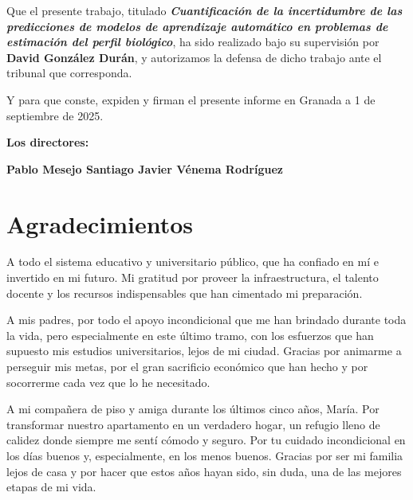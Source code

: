 Que el presente trabajo, titulado \textit{\textbf{Cuantificación de la incertidumbre de las predicciones de modelos de aprendizaje automático en problemas de estimación del perfil biológico}}, ha sido realizado bajo su supervisión por \textbf{David González Durán}, y autorizamos la defensa de dicho trabajo ante el tribunal que corresponda.

\vspace{0.5cm}

Y para que conste, expiden y firman el presente informe en Granada a 1 de septiembre de 2025.

\vspace{1cm}

\textbf{Los directores:}

\vspace{5cm}

\noindent \textbf{Pablo Mesejo Santiago \hfill Javier Vénema Rodríguez}


\cleardoublepage

\chapter*{\vspace{-1cm}Agradecimientos}
\thispagestyle{empty}

\vspace{0.1cm}

A todo el sistema educativo y universitario público, que ha confiado en mí e invertido en mi futuro. Mi gratitud por proveer la infraestructura, el talento docente y los recursos indispensables que han cimentado mi preparación. 

A mis padres, por todo el apoyo incondicional que me han brindado durante toda la vida, pero especialmente en este último tramo, con los esfuerzos que han supuesto mis estudios universitarios, lejos de mi ciudad.  Gracias por animarme a perseguir mis metas, por el gran sacrificio económico que han hecho y por socorrerme cada vez que lo he necesitado. 

A mi compañera de piso y amiga durante los últimos cinco años, María. Por transformar nuestro apartamento en un verdadero hogar, un refugio lleno de calidez donde siempre me sentí cómodo y seguro. Por tu cuidado incondicional en los días buenos y, especialmente, en los menos buenos. Gracias por ser mi familia lejos de casa y por hacer que estos años hayan sido, sin duda, una de las mejores etapas de mi vida.

